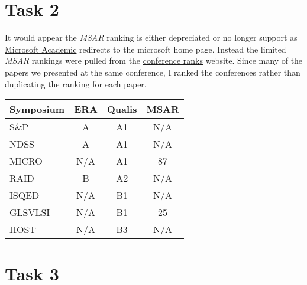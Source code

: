 \documentclass{article}
\begin{document}
	\section*{Task 2}
	It would appear the \textit{MSAR} ranking is either depreciated or no longer support as \href{http://academic.microsoft.com}{Microsoft Academic} redirects to the microsoft home page. Instead the limited \textit{MSAR} rankings were pulled from the \href{http://www.conferenceranks.com/visualization/msar2014.html?}{conference ranks} website. Since many of the papers we presented at the same conference, I ranked the conferences rather than duplicating the ranking for each paper. 
	
	\begin{center}
		\begin{tabular}{|l| c| c | c |} 
			\hline
			Symposium & ERA & Qualis & MSAR \\ [0.5ex] 
			
			\hline\hline
			 S\&P & A & A1 & N/A   \\
			\hline
			NDSS & A & A1 & N/A \\
			\hline
			MICRO & N/A & A1 & 87 \\
			\hline
			RAID & B & A2 & N/A \\
			\hline
			ISQED & N/A & B1 & N/A \\ 
			\hline
			GLSVLSI & N/A & B1 & 25 \\
			\hline
			HOST & N/A & B3 & N/A \\ [1ex] 
			\hline
		\end{tabular}
	\end{center}
	
	\section*{Task 3}
	
\end{document}
